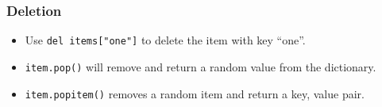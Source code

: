 \subsubsection{Deletion}\label{ssub:deletion}

\begin{itemize}
	\item Use \texttt{del items["one"]} to delete the item with key ``one''.
	\item \texttt{item.pop()} will remove and return a random value from the dictionary.
	\item \texttt{item.popitem()} removes a random item and return a key, value pair.
\end{itemize}
